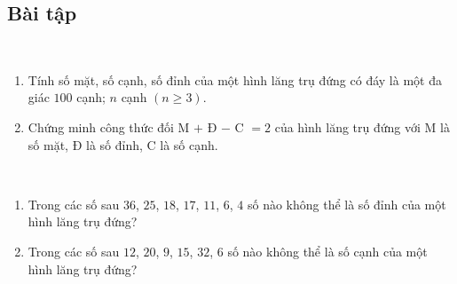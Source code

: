 \subsection{Bài tập}
\begin{bt}~\\%
\begin{enumerate}
	\item Tính số mặt, số cạnh, số đỉnh của một hình lăng trụ đứng có đáy là một đa giác $100$ cạnh; $n$ cạnh $(n\ge 3)$.
	\item Chứng minh công thức đối M $+$ Đ $-$ C $=2$ của hình lăng trụ đứng với M là số mặt, Đ là số đỉnh, C là số cạnh.
\end{enumerate}
\end{bt}
\begin{bt}~\\%
	\begin{enumerate}
		\item Trong các số sau $36$, $25$, $18$, $17$, $11$, $6$, $4$ số nào không thể là số đỉnh của một hình lăng trụ đứng?
		\item Trong các số sau $12$, $20$, $9$, $15$, $32$, $6$ số nào không thể là số cạnh của một hình lăng trụ đứng?
	\end{enumerate}
\end{bt}
